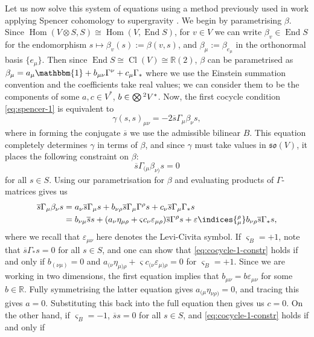 \documentclass[10pt,a4paper]{amsart}
\numberwithin{equation}{section}
\newcommand{\fso}{\mathfrak{so}}
\newcommand{\RR}{\mathbb{R}}
\newcommand{\Otimes}{\mathchoice{{\textstyle\bigotimes}}{\bigotimes}{\bigotimes}{\bigotimes}}
\newcommand{\1}{\mathbbm{1}}
\DeclareMathOperator{\End}{End}
\DeclareMathOperator{\Hom}{Hom}
\DeclareMathOperator{\Cl}{Cl}
\begin{document}
Let us now solve this system of equations using a method previously used in work applying Spencer cohomology to supergravity \cite{Beckett2021,deMedeiros2016,deMedeiros2018,Figueroa-OFarrill2017}. We begin by parametrising $\beta$. Since $\Hom(V\otimes S,S)\cong\Hom(V,\End S)$, for $v\in V$ we can write $\beta_v\in\End S$ for the endomorphism $s\mapsto\beta_v(s):=\beta(v,s)$, and $\beta_\mu:=\beta_{e_\mu}$ in the orthonormal basis $\{e_\mu\}$. Then since $\End S\cong \Cl(V)\cong\RR(2)$, $\beta$ can be parametrised as
$\beta_\mu = a_\mu \1 + b_{\mu\nu}\Gamma^\nu + c_\mu \Gamma_*
$
where we use the Einstein summation convention and the coefficients take real values; we can consider them to be the components of some $a,c\in V^*$, $b\in \Otimes^2V^*$. Now, the first cocycle condition \eqref{eq:spencer-1} is equivalent to
\[
	\gamma(s,s)_{\mu\nu} = -2\overline{s}\Gamma_\mu\beta_\nu s,
\]
where in forming the conjugate $\overline{s}$ we use the admissible bilinear $B$. This equation completely determines $\gamma$ in terms of $\beta$, and since $\gamma$ must take values in $\fso(V)$, it places the following constraint on $\beta$:
\begin{equation}\label{eq:cocycle-1-constr}
	\overline{s}\Gamma_{(\mu}\beta_{\nu)} s = 0
\end{equation}
for all $s\in S$. Using our parametrisation for $\beta$ and evaluating products of $\Gamma$-matrices gives us
\begin{align*}
	\overline{s}\Gamma_\mu\beta_\nu s
		&= a_\nu\overline{s}\Gamma_\mu s + b_{\nu\rho}\overline{s}\Gamma_\mu\Gamma^\rho s + c_\nu\overline{s}\Gamma_\mu\Gamma_*s	\\
		&= b_{\nu\mu}\overline{s}s + (a_\nu\eta_{\mu\rho} + \varsigma c_\nu\varepsilon_{\mu\rho})\overline{s}\Gamma^\rho s + \varepsilon\indices{_\mu^\rho} b_{\nu\rho}\overline{s}\Gamma_* s,
\end{align*}
where we recall that $\varepsilon_{\mu\nu}$ here denotes the Levi-Civita symbol. If $\varsigma_B=+1$, note that $\overline s\Gamma_*s=0$ for all $s\in S$, and one can show that \eqref{eq:cocycle-1-constr} holds if and only if
$b_{(\nu\mu)} = 0
$ and $
	a_{(\nu}\eta_{\mu)\rho}+\varsigma c_{(\nu}\varepsilon_{\mu)\rho} = 0$ for $\varsigma_B=+1$.
Since we are working in two dimensions, the first equation implies that ${b_{\mu\nu}=b\varepsilon_{\mu\nu}}$ for some $b\in\RR$. Fully symmetrising the latter equation gives $a_{(\mu}\eta_{\nu\rho)}=0$, and tracing this gives ${a=0}$. Substituting this back into the full equation then gives us $c=0$. On the other hand, if $\varsigma_B=-1$, $\overline{s}s = 0$ for all $s\in S$, and \eqref{eq:cocycle-1-constr} holds if and only if
\end{document}
